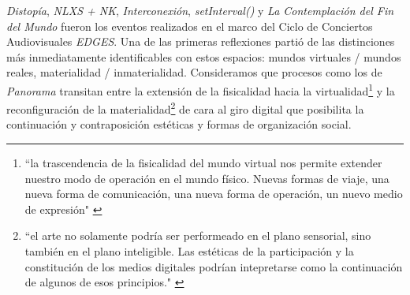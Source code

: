 \textit{Distopía}, \textit{NLXS + NK}, \textit{Interconexión}, \textit{setInterval()} y \textit{La Contemplación del Fin del Mundo} fueron los eventos realizados en el marco del Ciclo de Conciertos Audiovisuales \textit{EDGES}. Una de las primeras reflexiones partió de las distinciones más inmediatamente identificables con estos espacios: mundos virtuales / mundos reales, materialidad / inmaterialidad. Consideramos que procesos como los de \textit{Panorama} transitan entre la extensión de la fisicalidad hacia la virtualidad\footnote{``la trascendencia de la fisicalidad del mundo virtual nos permite extender nuestro modo de operación en el mundo físico. Nuevas formas de viaje, una nueva forma de comunicación, una nueva forma de operación, un nuevo medio de expresión" \citep[pp.~49]{cyberspace}}  y la reconfiguración de la materialidad\footnote{``el arte no solamente podría ser performeado en el plano sensorial, sino también en el plano inteligible. Las estéticas de la participación y la constitución de los medios digitales podrían intepretarse como la continuación de algunos de esos principios." \citep[pp.~190]{andreasosa}} de cara al giro digital que posibilita la continuación y contraposición estéticas y formas de organización social. 

\color{black}



